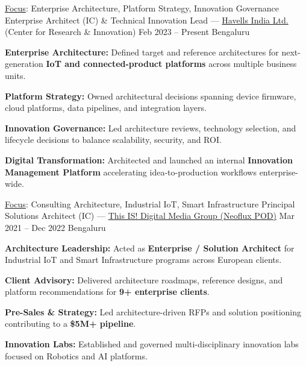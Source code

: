\documentclass[11pt, a4paper]{awesome-cv}
\begin{document}
\begin{cventries}

\cventry
  {\underline{Focus}: Enterprise Architecture, Platform Strategy, Innovation Governance}
  {Enterprise Architect (IC) \& Technical Innovation Lead — \underline{Havells India Ltd.} (Center for Research \& Innovation)}
  {Feb 2023 – Present}
  {Bengaluru}
  {
    \begin{cvitems}
      \item {\textbf{Enterprise Architecture:} Defined target and reference architectures for next-generation \textbf{IoT and connected-product platforms} across multiple business units.}
      \item {\textbf{Platform Strategy:} Owned architectural decisions spanning device firmware, cloud platforms, data pipelines, and integration layers.}
      \item {\textbf{Innovation Governance:} Led architecture reviews, technology selection, and lifecycle decisions to balance scalability, security, and ROI.}
      \item {\textbf{Digital Transformation:} Architected and launched an internal \textbf{Innovation Management Platform} accelerating idea-to-production workflows enterprise-wide.}
    \end{cvitems}
  }

\vspace{1.2em}

\cventry
  {\underline{Focus}: Consulting Architecture, Industrial IoT, Smart Infrastructure}
  {Principal Solutions Architect (IC) — \underline{This IS! Digital Media Group (Neoflux POD)}}
  {Mar 2021 – Dec 2022}
  {Bengaluru}
  {
    \begin{cvitems}
      \item {\textbf{Architecture Leadership:} Acted as \textbf{Enterprise / Solution Architect} for Industrial IoT and Smart Infrastructure programs across European clients.}
      \item {\textbf{Client Advisory:} Delivered architecture roadmaps, reference designs, and platform recommendations for \textbf{9+ enterprise clients}.}
      \item {\textbf{Pre-Sales \& Strategy:} Led architecture-driven RFPs and solution positioning contributing to a \textbf{\$5M+ pipeline}.}
      \item {\textbf{Innovation Labs:} Established and governed multi-disciplinary innovation labs focused on Robotics and AI platforms.}
    \end{cvitems}
  }


\end{cventries}
\end{document}
